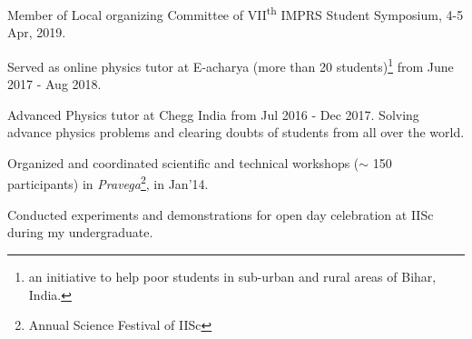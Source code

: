\documentclass[12pt,letterpaper]{article}
\begin{document}
\begin{list}{}{\cvlist}
    \item Member of Local organizing Committee of VII\textsuperscript{th} IMPRS Student Symposium, 4-5 Apr, 2019.
  \item Served as online physics tutor at E-acharya (more than 20 students)\footnote{an initiative to help poor students in sub-urban and rural areas of Bihar, India.} from June 2017 - Aug 2018.
    \item Advanced Physics tutor at Chegg India from Jul 2016 - Dec 2017. Solving advance physics problems and clearing doubts of students from all over the world.
  \item Organized and coordinated scientific and technical workshops ($\sim$ 150 participants) in \emph{Pravega}\footnote{Annual Science Festival of IISc}, in Jan'14.
    \item Conducted experiments and demonstrations for open day celebration at IISc during my undergraduate.
\end{list}
\end{document}
